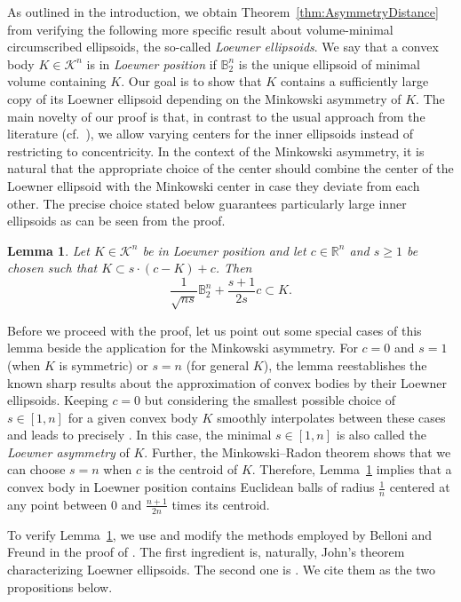 \documentclass{amsart}
\newtheorem{lemma}[theorem]{Lemma}
\newcommand{\cemph}[1]{\emph{\color{red}#1}}
\newcommand\R{\mathbb{R}}
\newcommand\B{\mathbb{B}}
\newcommand\CK{\mathcal{K}}
\begin{document}
As outlined in the introduction, we obtain Theorem~\ref{thm:AsymmetryDistance} from verifying the following more specific result about volume-minimal circumscribed ellipsoids,
the so-called \cemph{Loewner ellipsoids}.
We say that a convex body $K \in \CK^n$ is in \cemph{Loewner position}
if $\B_2^n$ is the unique ellipsoid of minimal volume containing $K$.
Our goal is to show that $K$ contains a sufficiently large copy of its Loewner ellipsoid depending on the Minkowski asymmetry of $K$.
The main novelty
of our proof is that, in contrast to the usual approach from the literature (cf.~\cite[Theorem~$9$]{2008:BelloniFreund}),
we allow varying centers for the inner ellipsoids instead of restricting to concentricity.
In the context of the Minkowski asymmetry, it is natural that the appropriate choice of the center should combine the center of the Loewner ellipsoid with the Minkowski center in case they deviate from each other.
The precise choice stated below guarantees particularly large inner ellipsoids as can be seen from the proof.


\begin{lemma} \label{lem:befrconj}
Let $K \in \CK^n$ be in Loewner position and let $c \in \R^n$ and $s \geq 1$ be chosen such that $K \subset s \cdot (c - K) + c$.
Then
\[
	\frac{1}{\sqrt{n s}} \B_2^n + \frac{s+1}{2s} c
	\subset K.
\]
\end{lemma}



Before we proceed with the proof, let us point out some special cases of this lemma beside the application for the Minkowski asymmetry.
For $c = 0$ and $s = 1$ (when $K$ is symmetric) or $s = n$ (for general $K$),
the lemma reestablishes the known sharp results about the approximation of convex bodies by their Loewner ellipsoids.
Keeping $c = 0$ but considering the smallest possible choice of $s \in [1,n]$ for a given convex body $K$ smoothly interpolates between these cases and leads to precisely \cite[Theorem~$9$]{2008:BelloniFreund}.
In this case, the minimal $s \in [1,n]$ is also called the \emph{Loewner asymmetry} of $K$.
Further, the Minkowski--Radon theorem shows that we can choose $s = n$ when $c$ is the centroid of $K$.
Therefore, Lemma~\ref{lem:befrconj} implies that a convex body in Loewner position contains Euclidean balls of radius $\frac{1}{n}$ centered at any point between $0$ and $\frac{n+1}{2n}$ times its centroid.

To verify Lemma~\ref{lem:befrconj}, we use and modify the methods employed by Belloni and Freund in the proof of \cite[Theorem~9]{2008:BelloniFreund}.
The first ingredient is, naturally, John's theorem \cite{1948:John} characterizing Loewner ellipsoids.
The second one is \cite[Proposition~4]{2008:BelloniFreund}. We cite them as the two propositions below.
\end{document}
